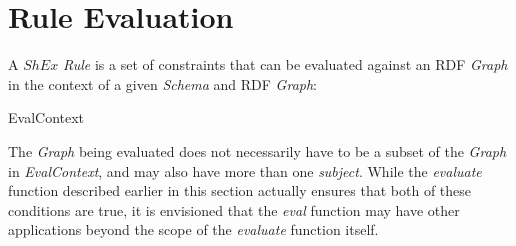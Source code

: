 \documentclass[fuzz]{llncs}
\def\zc{\textit}
\begin{document}
\section{Rule Evaluation}
A $ShEx$ \zc{Rule} is a set of constraints that can be evaluated against an RDF
\zc{Graph} in the context of a given \zc{Schema} and RDF \zc{Graph}:
\begin{zed}
EvalContext  \\
\end{zed}
The \zc{Graph} being evaluated does not necessarily have to be a subset of the
\zc{Graph} in \zc{EvalContext}, and may also have
more than one \zc{subject}.  While the \zc{evaluate} function described earlier in this section 
actually ensures that both of these conditions are true, it is envisioned that the \zc{eval} 
function may have other applications beyond the scope of the \zc{evaluate} function itself.
\end{document}
